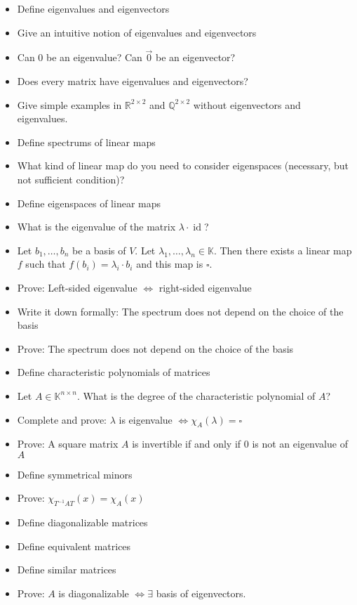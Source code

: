 \documentclass[a4paper]{article}
\begin{document}
\begin{itemize}
  \item Define eigenvalues and eigenvectors
  \item Give an intuitive notion of eigenvalues and eigenvectors
  \item Can 0 be an eigenvalue? Can $\vec 0$ be an eigenvector?
  \item Does every matrix have eigenvalues and eigenvectors?
  \item Give simple examples in $\mathbb R^{2 \times 2}$ and $\mathbb Q^{2 \times 2}$ without eigenvectors and eigenvalues.
  \item Define spectrums of linear maps
  \item What kind of linear map do you need to consider eigenspaces (necessary, but not sufficient condition)?
  \item Define eigenspaces of linear maps
  \item What is the eigenvalue of the matrix $\lambda \cdot \operatorname{id}$?
  \item Let $b_1, \dots, b_n$ be a basis of $V$. Let $\lambda_1, \dots, \lambda_n \in \mathbb K$. Then there exists a linear map $f$ such that $f(b_i) = \lambda_i \cdot b_i$ and this map is $\square{}$.
  \item Prove: Left-sided eigenvalue $\iff$ right-sided eigenvalue
  \item Write it down formally: The spectrum does not depend on the choice of the basis
  \item Prove: The spectrum does not depend on the choice of the basis
  \item Define characteristic polynomials of matrices
  \item Let $A \in \mathbb K^{n \times n}$. What is the degree of the characteristic polynomial of $A$?
  \item Complete and prove: $\lambda$ is eigenvalue $\iff \chi_A(\lambda) = \square{}$
  \item Prove: A square matrix $A$ is invertible if and only if $0$ is not an eigenvalue of $A$
  \item Define symmetrical minors
  \item Prove: $\chi_{T^{-1} AT}(x) = \chi_A(x)$
  \item Define diagonalizable matrices
  \item Define equivalent matrices
  \item Define similar matrices
  \item Prove: $A$ is diagonalizable $\iff \exists$ basis of eigenvectors.

\end{itemize}
\end{document}
